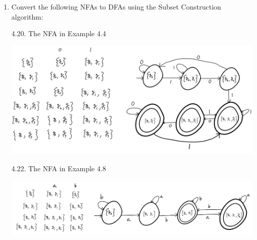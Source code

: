 \documentclass[10pt]{article}
\begin{document}
\begin{enumerate}[label={}]
      \item Convert the following NFAs to DFAs using the Subset Construction algorithm:


            4.20. The NFA in Example 4.4

            \includegraphics[scale=0.5]{4.20}

            4.22. The NFA in Example 4.8

            \includegraphics[scale=0.5]{4.22}





\end{enumerate}
\end{document}
